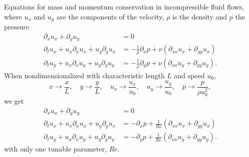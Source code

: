 Equations for mass and momentum conservation in incompressible fluid flows, where $u_x$ and $u_y$ are the components of the velocity, $\rho$ is the density and $p$ the pressure
\begin{equation}
  \label{eq: navier stokes}
  \begin{aligned}
    \partial_x u_x + \partial_y u_y & = 0 \\
    \partial_t u_x + u_x\partial_x u_x + u_y\partial_y u_x & = -\frac{1}{\rho} \partial_x p + \nu \left(\partial_{xx} u_x + \partial_{yy} u_x\right) \\
    \partial_t u_y + u_x\partial_x u_y + u_y\partial_y u_y & = -\frac{1}{\rho} \partial_y p + \nu \left(\partial_{xx} u_y + \partial_{yy} u_y\right).
  \end{aligned}
\end{equation}
When nondimensionalized with characteristic length $L$ and speed $u_0$,
\begin{equation}
    x  \rightarrow \frac{x}{L},\quad
    y  \rightarrow \frac{y}{L},\quad
    u_x  \rightarrow \frac{u_x}{u_0},\quad
    u_y  \rightarrow \frac{u_y}{u_0},\quad
    p  \rightarrow \frac{p}{\rho u_0^2},
\end{equation}
we get
\begin{equation}
  \label{eq: navier stokes nondim}
  \begin{aligned}
    \partial_x u_x + \partial_y u_y & = 0 \\
    \partial_t u_x + u_x\partial_x u_x + u_y\partial_y u_x & = - \partial_x p + \frac{1}{Re} \left(\partial_{xx} u_x + \partial_{yy} u_x\right) \\
    \partial_t u_y + u_x\partial_x u_y + u_y\partial_y u_y & = - \partial_y p + \frac{1}{Re} \left(\partial_{xx} u_y + \partial_{yy} u_y\right).
  \end{aligned}
\end{equation}
with only one tunable parameter, $Re$.

